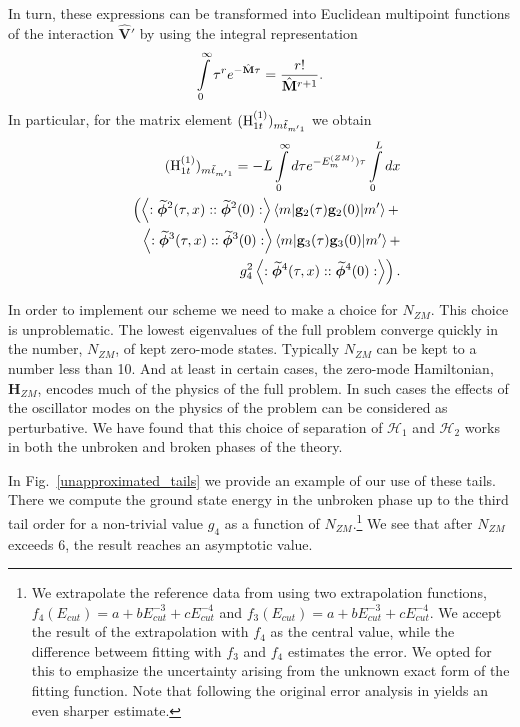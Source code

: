 \documentclass[twocolumn,secnumarabic,amssymb, nobibnotes, aps, prd]{revtex4-2}
\newcommand{\be}{\begin{equation}}
\newcommand{\ee}{\end{equation}}
\newcommand{\bea}{\begin{eqnarray}}
\newcommand{\eea}{\end{eqnarray}}
\begin{document}
In turn, these expressions can be transformed into Euclidean multipoint functions of the interaction $\mathbf{\hat V'}$ by using the integral representation 
\be
\intop_0^\infty \tau^r e^{-\hat{\mathbf{M}} \tau} =\frac{r!}{\hat{\mathbf{M}}^{r+1}}.\label{DenomToMultipoint}
\ee
In particular, for the matrix element $({\rm H}_{1t}^{(1)})_{m\tilde t_{m'1}}$ we obtain
\bea
&&(\Hlt{1})_{m\tilde t_{m'1}}=-L\intop_{0}^{\infty}d\tau e^{-E_m^{(ZM)})\tau}\intop_{0}^L dx\nonumber\\
&&\left(\left\langle:\widetilde{\boldsymbol\phi}^2(\tau,x)::\widetilde{\boldsymbol\phi}^2(0):\right\rangle \braket{m|\mathbf{g}_2(\tau)\mathbf{g}_2(0)|m'}+\right.\nonumber\\
&&\left\langle:\widetilde{\boldsymbol\phi}^3(\tau,x)::\widetilde{\boldsymbol\phi}^3(0):\right\rangle \braket{m|\mathbf{g}_3(\tau)\mathbf{g}_3(0)|m'}+\nonumber\\
&&\left.g_4^2\left\langle:\widetilde{\boldsymbol\phi}^4(\tau,x)::\widetilde{\boldsymbol\phi}^4(0):\right\rangle\right).
\eea

In order to implement our scheme we need to make a choice for $N_{ZM}$. This choice is unproblematic.  The lowest eigenvalues of the full problem converge quickly in the number, $N_{ZM}$, of kept zero-mode states. Typically $N_{ZM}$ can be kept to a number less than 10.  And at least in certain cases, the zero-mode Hamiltonian, $\mathbf{H}_{ZM}$, encodes much of the physics of the full problem.  In such cases the effects of the oscillator modes on the physics of the problem can be considered as perturbative.  We have found that this choice of separation of $\mathcal{H}_1$ and $\mathcal{H}_2$ works in both the unbroken and broken phases of the theory.

In Fig.~\ref{unapproximated_tails} we provide an example of our use of these tails. There we compute the ground state energy in the unbroken phase up to the third tail order for a non-trivial value $g_4$ as a function of $N_{ZM}$.\footnote{We extrapolate the reference data from \cite{Elias-Miro:2017tup} using two extrapolation functions, $f_4(E_{cut})=a+b E_{cut}^{-3}+ c E_{cut}^{-4}$ and $f_3(E_{cut})=a+b E_{cut}^{-3}+ c E_{cut}^{-4}$. We accept the result of the extrapolation with $f_4$ as the central value, while the difference betweem fitting with $f_3$ and $f_4$ estimates the error. We opted for this to emphasize the uncertainty arising from the unknown exact form of the  fitting function. Note that following the original error analysis in \cite{Elias-Miro:2017tup} yields an even sharper estimate.}  We see that after $N_{ZM}$ exceeds 6, the result reaches an asymptotic value.
\end{document}

